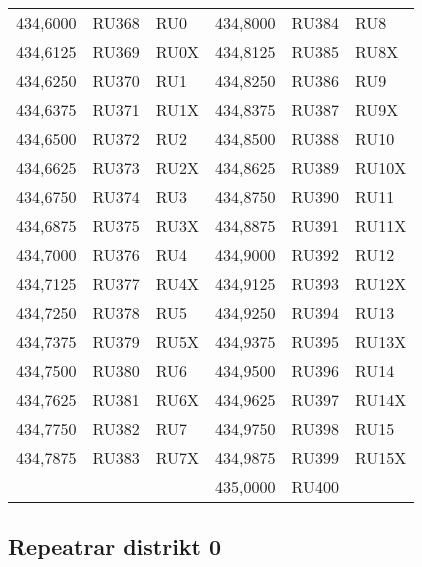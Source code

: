 {\begin{longtable}{rrl|rrl}
434,6000 & RU368 & RU0  & 434,8000 & RU384 & RU8   \\
434,6125 & RU369 & RU0X & 434,8125 & RU385 & RU8X  \\
434,6250 & RU370 & RU1  & 434,8250 & RU386 & RU9   \\
434,6375 & RU371 & RU1X & 434,8375 & RU387 & RU9X  \\
434,6500 & RU372 & RU2  & 434,8500 & RU388 & RU10  \\
434,6625 & RU373 & RU2X & 434,8625 & RU389 & RU10X \\
434,6750 & RU374 & RU3  & 434,8750 & RU390 & RU11  \\
434,6875 & RU375 & RU3X & 434,8875 & RU391 & RU11X \\
434,7000 & RU376 & RU4  & 434,9000 & RU392 & RU12  \\
434,7125 & RU377 & RU4X & 434,9125 & RU393 & RU12X \\
434,7250 & RU378 & RU5  & 434,9250 & RU394 & RU13  \\
434,7375 & RU379 & RU5X & 434,9375 & RU395 & RU13X \\
434,7500 & RU380 & RU6  & 434,9500 & RU396 & RU14  \\
434,7625 & RU381 & RU6X & 434,9625 & RU397 & RU14X \\
434,7750 & RU382 & RU7  & 434,9750 & RU398 & RU15  \\
434,7875 & RU383 & RU7X & 434,9875 & RU399 & RU15X \\
         &       &      & 435,0000 & RU400 &       \\
\end{longtable}

\normalsize


\clearpage

\begin{landscape}

\subsection{Repeatrar distrikt 0}


\end{landscape}}
